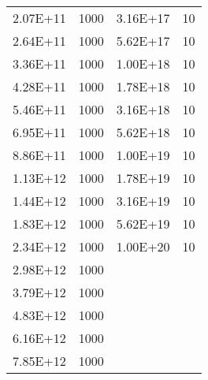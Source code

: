\begin{table}
\begin{center}
\begin{tabular}{l r | l r }
			 2.07E+11    & 1000    & 3.16E+17    & 10      \\
			 2.64E+11    & 1000    & 5.62E+17    & 10      \\
			 3.36E+11    & 1000    & 1.00E+18    & 10      \\
			 4.28E+11    & 1000    & 1.78E+18    & 10      \\
			 5.46E+11    & 1000    & 3.16E+18    & 10      \\
			 6.95E+11    & 1000    & 5.62E+18    & 10      \\
			 8.86E+11    & 1000    & 1.00E+19    & 10      \\
			 1.13E+12    & 1000    & 1.78E+19    & 10      \\
			 1.44E+12    & 1000    & 3.16E+19    & 10      \\
			 1.83E+12    & 1000    & 5.62E+19    & 10      \\
			 2.34E+12    & 1000    & 1.00E+20    & 10      \\
			 2.98E+12    & 1000    &             &         \\
			 3.79E+12    & 1000    &             &         \\
			 4.83E+12    & 1000    &             &         \\
			 6.16E+12    & 1000    &             &         \\
			 7.85E+12    & 1000    &             &         \\   
			\hline
		\end{tabular}
	\end{center}
\end{table}



